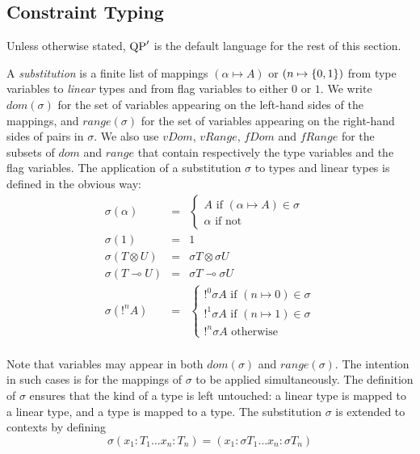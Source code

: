 \subsection{Constraint Typing}

Unless otherwise stated, ${\rm QP}'$ is the default language for the rest of this section.

\begin{defn} A \textit{substitution} is a finite list of mappings $(\alpha \mapsto A)$ or $(n \mapsto \{0, 1\})$
	from type variables to \textit{linear} types and from flag variables to either $0$ or $1$.
	We write $dom(\sigma)$ for the set of variables appearing on the left-hand sides of the mappings, and $range(\sigma)$ for the set of variables
	appearing on the right-hand sides of pairs in $\sigma$. We also use $vDom$, $vRange$, $fDom$ and $fRange$ for the subsets of $dom$ and $range$
	that contain respectively the type variables and the flag variables.
	The application of a substitution $\sigma$ to types and linear types is defined in the obvious way:
	$$
	\begin{array}{lcl}
		\sigma (\alpha) &=& \left\{ \begin{array}{l}
		                              A \text{ if } (\alpha \mapsto A) \in \sigma \\
      		                        \alpha \text{ if not}
		                            \end{array} \right. \\
		\sigma(1) &=& 1 \\
		\sigma(T \otimes U) &=& \sigma T \otimes \sigma U \\
		\sigma(T \multimap U) &=& \sigma T \multimap \sigma U \\
		\sigma(!^n A) &=& \left\{ \begin{array}{l}
																	!^{0} \sigma A \text{ if } (n \mapsto 0) \in \sigma \\
																	!^{1} \sigma A \text{ if } (n \mapsto 1) \in \sigma \\
																	!^n \sigma A \text{ otherwise}
																\end{array} \right. \\
	\end{array}
	$$
\end{defn}	

Note that variables may appear in both $dom(\sigma)$ and $range(\sigma)$. The intention in such cases is for the mappings of $\sigma$ to
be applied simultaneously. The definition of $\sigma$ ensures that the kind of a type is left untouched: a linear type is mapped to a linear
type, and a type is mapped to a type. The substitution $\sigma$ is extended to contexts by defining
 		$$\sigma (x_1 : T_1 \dots x_n : T_n) = (x_1 : \sigma T_1 \dots x_n : \sigma T_n)$$
 		
